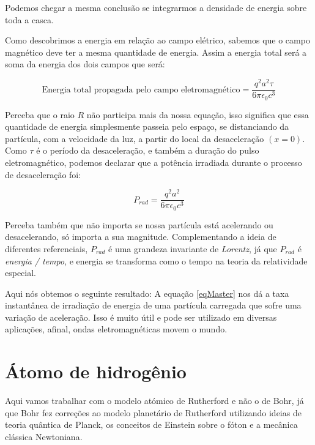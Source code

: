 \documentclass[12pt, letterpaper]{article}
\begin{document}
    Podemos chegar a mesma conclusão se integrarmos a densidade de energia sobre toda a casca.

    Como descobrimos a energia em relação ao campo elétrico, sabemos que o campo magnético deve ter a mesma quantidade de energia. Assim a energia total será a soma da energia dos dois campos que será:

    \begin{equation} \label{eq7}
        \textrm{Energia total propagada pelo campo eletromagnético} =\frac{q^2a^2\tau}{6\pi\epsilon_0c^3}
    \end{equation}

    Perceba que o raio $R$ não participa mais da nossa equação, isso significa que essa quantidade de energia simplesmente passeia pelo espaço, se distanciando da partícula, com a velocidade da luz, a partir do local da desaceleração $(x = 0)$. Como $\tau$ é o período da desaceleração, e também a duração do pulso eletromagnético, podemos declarar que a potência irradiada durante o processo de desaceleração foi:

    \begin{equation} \label{eqMaster}
        P_{rad} = \frac{q^2a^2}{6\pi\epsilon_0c^3}
    \end{equation}

    Perceba também que não importa se nossa partícula está acelerando ou desacelerando, só importa a sua magnitude. Complementando a ideia de diferentes referenciais, $P_{rad}$ é uma grandeza invariante de \textit{Lorentz}, já que $P_{rad}$ é \textit{energia / tempo}, e energia se transforma como o tempo na teoria da relatividade especial.

    Aqui nós obtemos o seguinte resultado: A equação \ref{eqMaster} nos dá a taxa instantânea de irradiação de energia de uma partícula carregada que sofre uma variação de aceleração. Isso é muito útil e pode ser utilizado em diversas aplicações, afinal, ondas eletromagnéticas movem o mundo.

\newpage
\section{Átomo de hidrogênio}

    Aqui vamos trabalhar com o modelo atómico de Rutherford e não o de Bohr, já que Bohr fez correções ao modelo planetário de Rutherford utilizando ideias de teoria quântica de Planck, os conceitos de Einstein sobre o fóton e a mecânica clássica Newtoniana.
\end{document}
